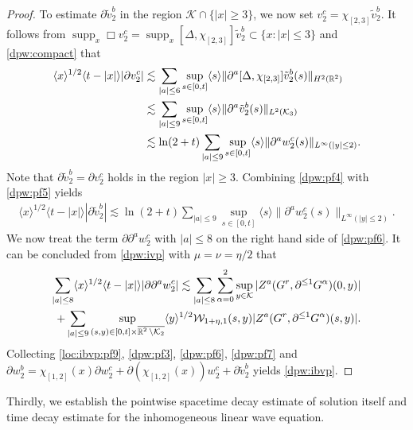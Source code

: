 \documentclass[11pt,twoside]{article}
\def\cK{\mathcal K}
\def\cW{\mathcal W}
\def\R{\mathop{\mathbb R\kern 0pt}\nolimits}
\def\supp{\mathop{\rm supp}\nolimits}
\def\p{\partial}
\def\supp{\operatorname{supp}}
\def\ls{\lesssim}
\newcommand{\w}[1]{\langle {#1} \rangle}
\theoremstyle{plain}
\theoremstyle{definition}
\numberwithin{equation}{section}
\begin{document}
\begin{proof}
To estimate $\p \tilde v_2^b$ in the region $\cK\cap\{|x|\ge3\}$, we now set $v_2^c=\chi_{[2,3]}\tilde v_2^b$.
It follows from $\supp_x\Box v_2^c=\supp_x[\Delta,\chi_{[2,3]}]\tilde v_2^b\subset\{x:|x|\le3\}$ and \eqref{dpw:compact} that
\begin{equation}\label{dpw:pf5}
\begin{split}
\w{x}^{1/2}\w{t-|x|}|\p v_2^c|
&\ls\sum_{|a|\le6}\sup_{s\in[0,t]}\w{s}\|\p^a[\Delta,\chi_{[2,3]}]\tilde v_2^b(s)\|_{H^2(\R^2)}\\
&\ls\sum_{|a|\le9}\sup_{s\in[0,t]}\w{s}\|\p^a\tilde v_2^b(s)\|_{L^2(\cK_3)}\\
&\ls\ln(2+t)\sum_{|a|\le9}\sup_{s\in[0,t]}\w{s}\|\p^aw_2^c(s)\|_{L^\infty(|y|\le2)}.
\end{split}
\end{equation}
Note that $\p \tilde v_2^b=\p v_2^c$ holds in the region $|x|\ge3$.
Combining \eqref{dpw:pf4} with \eqref{dpw:pf5} yields
\begin{equation}\label{dpw:pf6}
\begin{split}
\w{x}^{1/2}\w{t-|x|}|\p \tilde v_2^b|
\ls\ln(2+t)\sum_{|a|\le9}\sup_{s\in[0,t]}\w{s}\|\p^aw_2^c(s)\|_{L^\infty(|y|\le2)}.
\end{split}
\end{equation}
We now treat the term $\p\p^aw_2^c$ with $|a|\le8$ on the right hand side of \eqref{dpw:pf6}.
It can be concluded from \eqref{dpw:ivp} with $\mu=\nu=\eta/2$ that
\begin{equation}\label{dpw:pf7}
\begin{split}
\sum_{|a|\le8}\w{x}^{1/2}\w{t-|x|}|\p\p^aw_2^c|
\ls\sum_{|a|\le8}\sum_{\alpha=0}^2\sup_{y\in\cK}|Z^a(G^r,\p^{\le1}G^\alpha)(0,y)|\\
+\sum_{|a|\le9}\sup_{(s,y)\in[0,t]\times\overline{\R^2\setminus\cK_2}}\w{y}^{1/2}\cW_{1+\eta,1}(s,y)|Z^a(G^r,\p^{\le1}G^\alpha)(s,y)|.
\end{split}
\end{equation}
Collecting \eqref{loc:ibvp:pf9}, \eqref{dpw:pf3}, \eqref{dpw:pf6}, \eqref{dpw:pf7} and $\p w_2^b=\chi_{[1,2]}(x)\p w_2^c+\p(\chi_{[1,2]}(x))w_2^c+\p\tilde v_2^b$ yields \eqref{dpw:ibvp}.
\end{proof}

Thirdly, we establish the pointwise spacetime decay estimate of solution itself and
time decay estimate for the inhomogeneous linear wave equation.
\end{document}
